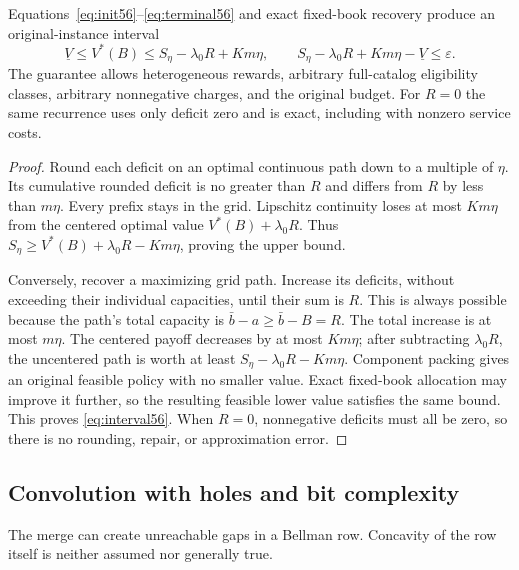 \begin{theorem}\label{thm:approx56}
Equations~\eqref{eq:init56}--\eqref{eq:terminal56} and exact fixed-book recovery produce an original-instance interval
\begin{equation}\label{eq:interval56}
 \underline V\leq V^*(B)\leq S_\eta-\lambda_0R+Km\eta,
 \qquad S_\eta-\lambda_0R+Km\eta-\underline V\leq\varepsilon.
\end{equation}
The guarantee allows heterogeneous rewards, arbitrary full-catalog eligibility classes, arbitrary nonnegative charges, and the original budget. For $R=0$ the same recurrence uses only deficit zero and is exact, including with nonzero service costs.
\end{theorem}
\begin{proof}
Round each deficit on an optimal continuous path down to a multiple of $\eta$. Its cumulative rounded deficit is no greater than $R$ and differs from $R$ by less than $m\eta$. Every prefix stays in the grid. Lipschitz continuity loses at most $Km\eta$ from the centered optimal value $V^*(B)+\lambda_0R$. Thus $S_\eta\geq V^*(B)+\lambda_0R-Km\eta$, proving the upper bound.

Conversely, recover a maximizing grid path. Increase its deficits, without exceeding their individual capacities, until their sum is $R$. This is always possible because the path's total capacity is $\bar b-a\geq\bar b-B=R$. The total increase is at most $m\eta$. The centered payoff decreases by at most $Km\eta$; after subtracting $\lambda_0R$, the uncentered path is worth at least $S_\eta-\lambda_0R-Km\eta$. Component packing gives an original feasible policy with no smaller value. Exact fixed-book allocation may improve it further, so the resulting feasible lower value satisfies the same bound. This proves \eqref{eq:interval56}. When $R=0$, nonnegative deficits must all be zero, so there is no rounding, repair, or approximation error.
\end{proof}

\subsection{Convolution with holes and bit complexity}
The merge can create unreachable gaps in a Bellman row. Concavity of the row itself is neither assumed nor generally true.

